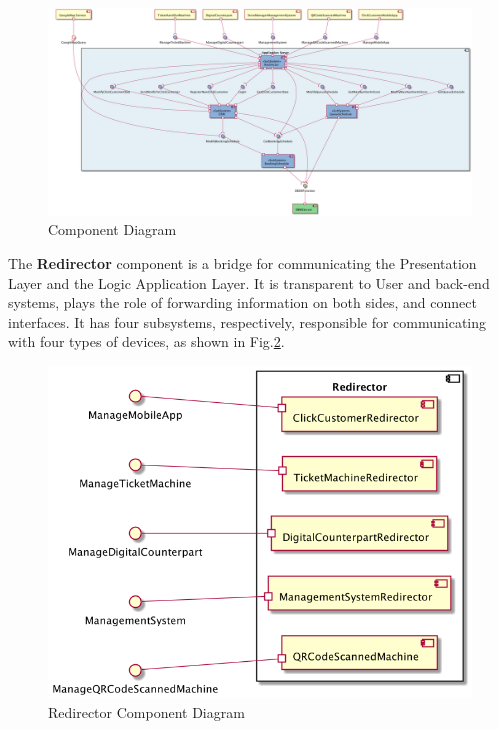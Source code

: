 \documentclass[a4paper,12pt]{report}
\begin{document}
\begin{figure}[H]
	\includegraphics[width=1.2\textwidth]{component_diagram}
	\centering
	\caption{Component Diagram}
	\label{fig:ComponentDiagram}
\end{figure}


The \textbf{Redirector} component is a bridge for communicating the Presentation Layer and the Logic Application Layer.
It is transparent to User and back-end systems, plays the role of forwarding information on both sides, and connect interfaces.
It has four subsystems, respectively, responsible for communicating with four types of devices, as shown in Fig.\ref{fig:component_diagram_redirector}.


\begin{figure}[H]
	\centering
	\includegraphics[scale=0.2]{component_diagram_redirector}
	\caption{Redirector Component Diagram}
	\centering
	\label{fig:component_diagram_redirector}
\end{figure}
\end{document}
